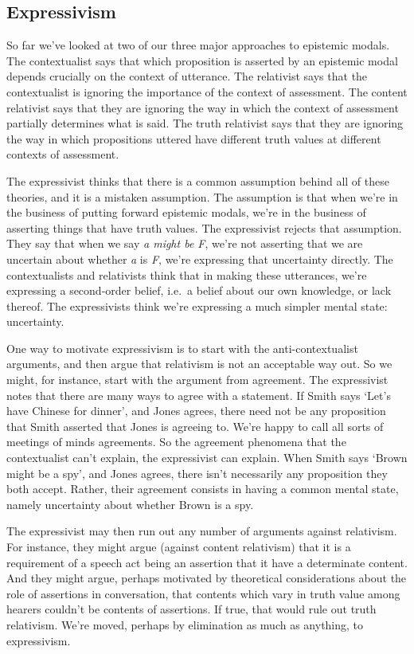 \documentclass[
  10pt,
  letterpaper,
  DIV=11,
  numbers=noendperiod,
  twoside]{scrartcl}
\begin{document}
\subsection{Expressivism}\label{expressivism}

So far we've looked at two of our three major approaches to epistemic
modals. The contextualist says that which proposition is asserted by an
epistemic modal depends crucially on the context of utterance. The
relativist says that the contextualist is ignoring the importance of the
context of assessment. The content relativist says that they are
ignoring the way in which the context of assessment partially determines
what is said. The truth relativist says that they are ignoring the way
in which propositions uttered have different truth values at different
contexts of assessment.

The expressivist thinks that there is a common assumption behind all of
these theories, and it is a mistaken assumption. The assumption is that
when we're in the business of putting forward epistemic modals, we're in
the business of asserting things that have truth values. The
expressivist rejects that assumption. They say that when we say \emph{a
might be F}, we're not asserting that we are uncertain about whether
\emph{a} is \emph{F}, we're expressing that uncertainty directly. The
contextualists and relativists think that in making these utterances,
we're expressing a second-order belief, i.e.~a belief about our own
knowledge, or lack thereof. The expressivists think we're expressing a
much simpler mental state: uncertainty.

One way to motivate expressivism is to start with the anti-contextualist
arguments, and then argue that relativism is not an acceptable way out.
So we might, for instance, start with the argument from agreement. The
expressivist notes that there are many ways to agree with a statement.
If Smith says `Let's have Chinese for dinner', and Jones agrees, there
need not be any proposition that Smith asserted that Jones is agreeing
to. We're happy to call all sorts of meetings of minds agreements. So
the agreement phenomena that the contextualist can't explain, the
expressivist can explain. When Smith says `Brown might be a spy', and
Jones agrees, there isn't necessarily any proposition they both accept.
Rather, their agreement consists in having a common mental state, namely
uncertainty about whether Brown is a spy.

The expressivist may then run out any number of arguments against
relativism. For instance, they might argue (against content relativism)
that it is a requirement of a speech act being an assertion that it have
a determinate content. And they might argue, perhaps motivated by
theoretical considerations about the role of assertions in conversation,
that contents which vary in truth value among hearers couldn't be
contents of assertions. If true, that would rule out truth relativism.
We're moved, perhaps by elimination as much as anything, to
expressivism.
\end{document}
